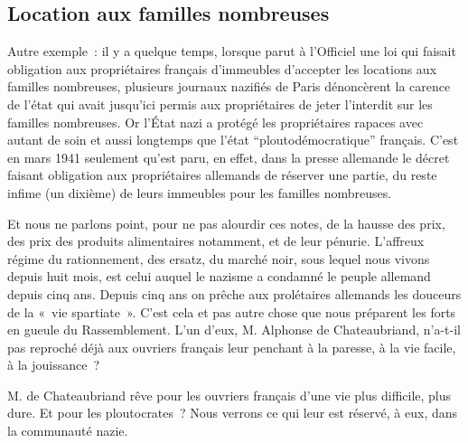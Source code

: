\documentclass[french,twoside]{book} %
\begin{document}
\subsection[Location aux familles nombreuses]{Location aux familles nombreuses}
\noindent Autre exemple : il y a quelque temps, lorsque parut à l’Officiel une loi qui faisait obligation aux propriétaires français d’immeubles d’accepter les locations aux familles nombreuses, plusieurs journaux nazifiés de Paris dénoncèrent la carence de l’état qui avait jusqu’ici permis aux propriétaires de jeter l’interdit sur les familles nombreuses. Or l’État nazi a protégé les propriétaires rapaces avec autant de soin et aussi longtemps que l’état “ploutodémocratique” français. C’est en mars 1941 seulement qu’est paru, en effet, dans la presse allemande le décret faisant obligation aux propriétaires allemands de réserver une partie, du reste infime (un dixième) de leurs immeubles pour les familles nombreuses.\par
Et nous ne parlons point, pour ne pas alourdir ces notes, de la hausse des prix, des prix des produits alimentaires notamment, et de leur pénurie. L’affreux régime du rationnement, des ersatz, du marché noir, sous lequel nous vivons depuis huit mois, est celui auquel le nazisme a condamné le peuple allemand depuis cinq ans. Depuis cinq ans on prêche aux prolétaires allemands les douceurs de la « vie spartiate ». C’est cela et pas autre chose que nous préparent les forts en gueule du Rassemblement. L’un d’eux, M. Alphonse de Chateaubriand, n’a-t-il pas reproché déjà aux ouvriers français leur penchant à la paresse, à la vie facile, à la jouissance ?\par
M. de Chateaubriand rêve pour les ouvriers français d’une vie plus difficile, plus dure. Et pour les ploutocrates ? Nous verrons ce qui leur est réservé, à eux, dans la communauté nazie.
\end{document}
